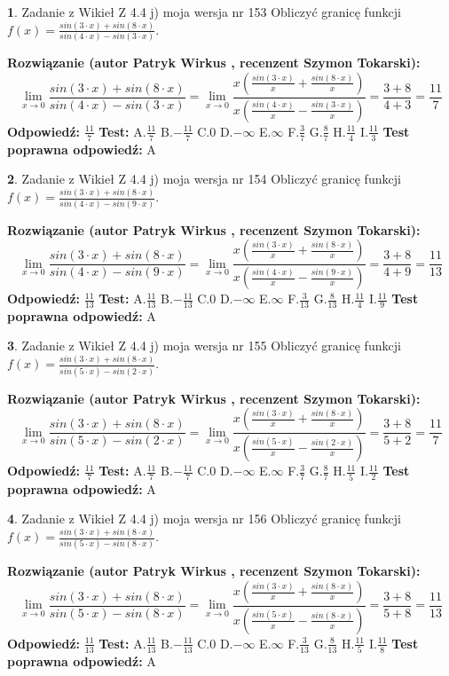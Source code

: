 \documentclass[12pt, a4paper]{article}
\theoremstyle{definition} %
\newtheorem{zad}{}
\newcommand{\zadStart}[1]{\begin{zad}#1\newline}
\newcommand{\zadStop}{\end{zad}}
\newcommand{\rozwStart}[2]{\noindent \textbf{Rozwiązanie (autor #1 , recenzent #2): }\newline}
\newcommand{\rozwStop}{\newline}
\newcommand{\odpStart}{\noindent \textbf{Odpowiedź:}\newline}
\newcommand{\odpStop}{\newline}
\newcommand{\testStart}{\noindent \textbf{Test:}\newline}
\newcommand{\testStop}{\newline}
\newcommand{\kluczStart}{\noindent \textbf{Test poprawna odpowiedź:}\newline}
\newcommand{\kluczStop}{\newline}
\begin{document}
\zadStart{Zadanie z Wikieł Z 4.4 j) moja wersja nr 153}
Obliczyć granicę funkcji $f(x)=\frac{sin(3\cdot x) +sin(8\cdot x)}{sin(4\cdot x) -sin(3\cdot x)}$.
\zadStop
\rozwStart{Patryk Wirkus}{Szymon Tokarski}
$$\lim\limits_{x\to 0}\frac{sin(3\cdot x) +sin(8\cdot x)}{sin(4\cdot x) -sin(3\cdot x)}=\lim\limits_{x\to 0}\frac{x(\frac{sin(3\cdot x)}{x}+\frac{sin(8\cdot x)}{x})}{x(\frac{sin(4\cdot x)}{x}-\frac{sin(3\cdot x)}{x})}=\frac{3+8}{4+3} = \frac{11}{7}$$
\rozwStop
\odpStart
$\frac{11}{7}$
\odpStop
\testStart
A.$\frac{11}{7}$
B.$-\frac{11}{7}$
C.$0$
D.$-\infty$
E.$\infty$
F.$\frac{3}{7}$
G.$\frac{8}{7}$
H.$\frac{11}{4}$
I.$\frac{11}{3}$
\testStop
\kluczStart
A
\kluczStop



\zadStart{Zadanie z Wikieł Z 4.4 j) moja wersja nr 154}
Obliczyć granicę funkcji $f(x)=\frac{sin(3\cdot x) +sin(8\cdot x)}{sin(4\cdot x) -sin(9\cdot x)}$.
\zadStop
\rozwStart{Patryk Wirkus}{Szymon Tokarski}
$$\lim\limits_{x\to 0}\frac{sin(3\cdot x) +sin(8\cdot x)}{sin(4\cdot x) -sin(9\cdot x)}=\lim\limits_{x\to 0}\frac{x(\frac{sin(3\cdot x)}{x}+\frac{sin(8\cdot x)}{x})}{x(\frac{sin(4\cdot x)}{x}-\frac{sin(9\cdot x)}{x})}=\frac{3+8}{4+9} = \frac{11}{13}$$
\rozwStop
\odpStart
$\frac{11}{13}$
\odpStop
\testStart
A.$\frac{11}{13}$
B.$-\frac{11}{13}$
C.$0$
D.$-\infty$
E.$\infty$
F.$\frac{3}{13}$
G.$\frac{8}{13}$
H.$\frac{11}{4}$
I.$\frac{11}{9}$
\testStop
\kluczStart
A
\kluczStop



\zadStart{Zadanie z Wikieł Z 4.4 j) moja wersja nr 155}
Obliczyć granicę funkcji $f(x)=\frac{sin(3\cdot x) +sin(8\cdot x)}{sin(5\cdot x) -sin(2\cdot x)}$.
\zadStop
\rozwStart{Patryk Wirkus}{Szymon Tokarski}
$$\lim\limits_{x\to 0}\frac{sin(3\cdot x) +sin(8\cdot x)}{sin(5\cdot x) -sin(2\cdot x)}=\lim\limits_{x\to 0}\frac{x(\frac{sin(3\cdot x)}{x}+\frac{sin(8\cdot x)}{x})}{x(\frac{sin(5\cdot x)}{x}-\frac{sin(2\cdot x)}{x})}=\frac{3+8}{5+2} = \frac{11}{7}$$
\rozwStop
\odpStart
$\frac{11}{7}$
\odpStop
\testStart
A.$\frac{11}{7}$
B.$-\frac{11}{7}$
C.$0$
D.$-\infty$
E.$\infty$
F.$\frac{3}{7}$
G.$\frac{8}{7}$
H.$\frac{11}{5}$
I.$\frac{11}{2}$
\testStop
\kluczStart
A
\kluczStop



\zadStart{Zadanie z Wikieł Z 4.4 j) moja wersja nr 156}
Obliczyć granicę funkcji $f(x)=\frac{sin(3\cdot x) +sin(8\cdot x)}{sin(5\cdot x) -sin(8\cdot x)}$.
\zadStop
\rozwStart{Patryk Wirkus}{Szymon Tokarski}
$$\lim\limits_{x\to 0}\frac{sin(3\cdot x) +sin(8\cdot x)}{sin(5\cdot x) -sin(8\cdot x)}=\lim\limits_{x\to 0}\frac{x(\frac{sin(3\cdot x)}{x}+\frac{sin(8\cdot x)}{x})}{x(\frac{sin(5\cdot x)}{x}-\frac{sin(8\cdot x)}{x})}=\frac{3+8}{5+8} = \frac{11}{13}$$
\rozwStop
\odpStart
$\frac{11}{13}$
\odpStop
\testStart
A.$\frac{11}{13}$
B.$-\frac{11}{13}$
C.$0$
D.$-\infty$
E.$\infty$
F.$\frac{3}{13}$
G.$\frac{8}{13}$
H.$\frac{11}{5}$
I.$\frac{11}{8}$
\testStop
\kluczStart
A
\kluczStop
\end{document}
